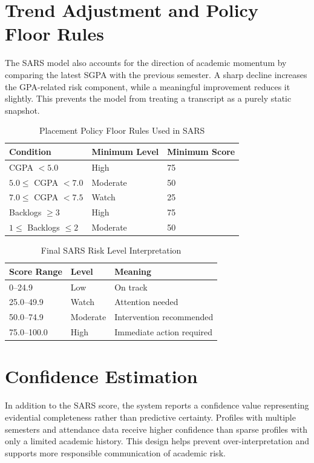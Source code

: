 \section{Trend Adjustment and Policy Floor Rules}
The SARS model also accounts for the direction of academic momentum by comparing the latest SGPA with the previous semester. A sharp decline increases the GPA-related risk component, while a meaningful improvement reduces it slightly. This prevents the model from treating a transcript as a purely static snapshot.

\begin{table}[H]
\centering
\caption{Placement Policy Floor Rules Used in SARS}
\begin{tabular}{lll}
\toprule
\textbf{Condition} & \textbf{Minimum Level} & \textbf{Minimum Score} \\
\midrule
CGPA $< 5.0$ & High & 75 \\
$5.0 \leq$ CGPA $< 7.0$ & Moderate & 50 \\
$7.0 \leq$ CGPA $< 7.5$ & Watch & 25 \\
Backlogs $\geq 3$ & High & 75 \\
$1 \leq$ Backlogs $\leq 2$ & Moderate & 50 \\
\bottomrule
\end{tabular}
\end{table}

\begin{table}[H]
\centering
\caption{Final SARS Risk Level Interpretation}
\begin{tabular}{lll}
\toprule
\textbf{Score Range} & \textbf{Level} & \textbf{Meaning} \\
\midrule
0--24.9 & Low & On track \\
25.0--49.9 & Watch & Attention needed \\
50.0--74.9 & Moderate & Intervention recommended \\
75.0--100.0 & High & Immediate action required \\
\bottomrule
\end{tabular}
\end{table}

\section{Confidence Estimation}
In addition to the SARS score, the system reports a confidence value representing evidential completeness rather than predictive certainty. Profiles with multiple semesters and attendance data receive higher confidence than sparse profiles with only a limited academic history. This design helps prevent over-interpretation and supports more responsible communication of academic risk.


